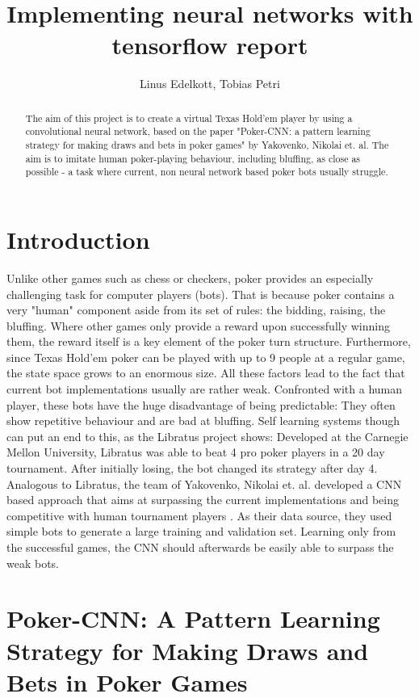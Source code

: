 \documentclass[]{report}
\title{Implementing neural networks with tensorflow report}
\author{Linus Edelkott, Tobias Petri}
\begin{document}
\maketitle

\begin{abstract}
The aim of this project is to create a virtual Texas Hold'em player by using a convolutional neural network, based on the paper "Poker-CNN: a pattern learning strategy for making draws and bets in poker games" \cite{1} by Yakovenko, Nikolai et. al.
The aim is to imitate human poker-playing behaviour, including bluffing, as close as possible - a task where current, non neural network based poker bots usually struggle.
\end{abstract}


\section{Introduction}
Unlike other games such as chess or checkers, poker provides an especially challenging task for computer players (bots). That is because poker contains a very "human" component aside from its set of rules: the bidding, raising, the bluffing. Where other games only provide a reward upon successfully winning them, the reward itself is a key element of the poker turn structure. Furthermore, since Texas Hold'em poker can be played with up to 9 people at a regular game, the state space grows to an enormous size. All these factors lead to the fact that current bot implementations usually are rather weak. Confronted with a human player, these bots have the huge disadvantage of being predictable: They often show repetitive behaviour and are bad at bluffing. Self learning systems though can put an end to this, as the Libratus project shows\cite{2}: Developed at the Carnegie Mellon University, Libratus was able to beat 4 pro poker players in a 20 day tournament. After initially losing, the bot changed its strategy after day 4. Analogous to Libratus, the team of Yakovenko, Nikolai et. al. developed a CNN based approach that aims at surpassing the current implementations and being competitive with human tournament players \cite{1}. As their data source, they used simple bots to generate a large training and validation set. Learning only from the successful games, the CNN should afterwards be easily able to surpass the weak bots.    

\section{Poker-CNN: A Pattern Learning Strategy for Making Draws and Bets in Poker Games}
\end{document}
